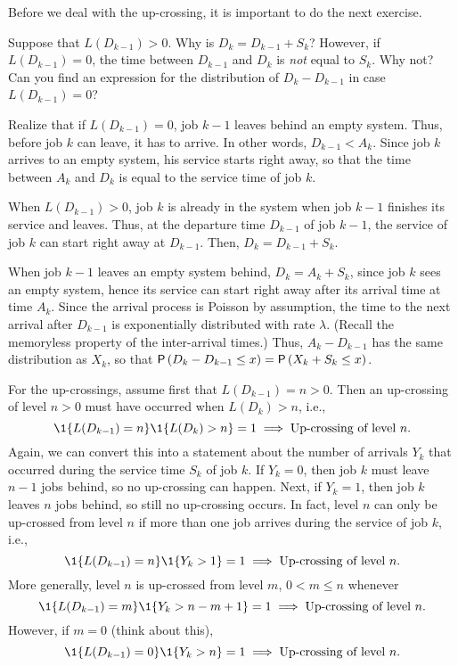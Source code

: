 \documentclass[companion]{subfiles}
\begin{document}
Before we deal with the up-crossing, it is important to do the next exercise.
\begin{exercise}
 Suppose that $L(D_{k-1})>0$.
 Why is $D_k = D_{k-1} + S_{k}$?
 However, if $L(D_{k-1}) = 0$, the time between $D_{k-1}$ and $D_k$ is \emph{not} equal to $S_k$.
 Why not?
 Can you find an expression for the distribution of $D_k-D_{k-1}$ in case $L(D_{k-1})=0$?
\begin{hint}
 Realize that if $L(D_{k-1})=0$, job $k-1$ leaves behind an empty system.
 Thus, before job $k$ can leave, it has to arrive.
 In other words, $D_{k-1}<A_k$.
 Since job $k$ arrives to an empty system, his service starts right away, so that the time between $A_k$ and $D_k$ is equal to the service time of job $k$.
\end{hint}
\begin{solution}
 When $L(D_{k-1})>0$, job $k$ is already in the system when job $k-1$
 finishes its service and leaves. Thus, at the departure time
 $D_{k-1}$ of job $k-1$, the service of job $k$ can start right away
 at $D_{k-1}$. Then, $D_k=D_{k-1}+S_k$.


 When job $k-1$ leaves an empty system behind, $D_k= A_k + S_k$,
 since job $k$ sees an empty system, hence its service can start
 right away after its arrival time at time $A_k$. Since the arrival
 process is Poisson by assumption, the time to the next arrival
 after $D_{k-1}$ is exponentially distributed with rate
 $\lambda$. (Recall the memoryless property of the inter-arrival
 times.) Thus, $A_k - D_{k-1}$ has the same distribution as $X_k$,
 so that $\P{D_k - D_{k-1} \leq x} = \P{X_k + S_k\leq x}$. 
\end{solution}
\end{exercise}

For the up-crossings, assume first that $L(D_{k-1})=n>0$. Then an up-crossing of level $n>0$ must have occurred when $L(D_k)>n$, i.e., 
 \begin{equation*}
 \1{L(D_{k-1}) = n}\1{L(D_k)>n} = 1 \implies \text{Up-crossing of level $n$}.
 \end{equation*}
Again, we can convert this into a statement about the number of
arrivals $Y_k$ that occurred during the service time $S_k$ of job $k$. If $Y_k=0$, then
job $k$ must leave $n-1$ jobs behind, so no up-crossing can
happen. Next, if $Y_k=1$, then job $k$ leaves $n$ jobs behind, so
still no up-crossing occurs. In fact, level $n$ can only be up-crossed from level $n$ if
more than one job arrives during the service of job $k$, i.e.,
\begin{equation*}
\1{L(D_{k-1})=n} \1{Y_{k}>1} = 1 \implies \text{Up-crossing of level $n$}.
\end{equation*}
More generally, level $n$ is up-crossed from level $m$, $0<m\leq n$ whenever
\begin{equation*}
\1{L(D_{k-1})=m} \1{Y_{k}>n-m+1} = 1 \implies \text{Up-crossing of level $n$}.
\end{equation*}
However, if $m=0$ (think about this),
\begin{equation*}
\1{L(D_{k-1})=0} \1{Y_{k}>n} = 1 \implies \text{Up-crossing of level $n$}.
\end{equation*}
\end{document}
